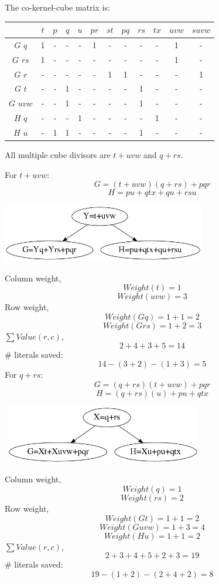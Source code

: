 \documentclass[12pt]{article}
\begin{document}
The co-kernel-cube matrix is:
\begin{center}
    \tabcolsep=8pt
    \begin{tabular}{|c|ccccccccccc|}
        \hline
                  & $t$ & $p$ & $q$ & $u$ & $pr$ & $st$ & $pq$ & $rs$ & $tx$ & $uvw$ & $suvw$ \\
        \hline
        $G$ $q$   & 1   & -  &  -   & -   & 1    & -    & -    & -    & -    & 1     & -      \\
        $G$ $rs$  & 1   & -  &  -   & -   & -    & -    & -    & -    & -    & 1     & -      \\
        $G$ $r$   & -   & -  &  -   & -   & -    & 1    & 1    & -    & -    & -     & 1      \\
        $G$ $t$   & -   & -  &  1   & -   & -    & -    & -    & 1    & -    & -     & -      \\
        $G$ $uvw$ & -   & -  &  1   & -   & -    & -    & -    & 1    & -    & -     & -      \\
        $H$ $q$   & -   & -  &  -   & 1   & -    & -    & -    & -    & 1    & -     & -      \\
        $H$ $u$   & -   & 1  &  1   & -   & -    & -    & -    & 1    & -    & -     & -      \\
        \hline
    \end{tabular}
\end{center}

All multiple cube divisors are $t+uvw$ and $q+rs$.

For $t+uvw$:
\[G=(t+uvw)(q+rs)+pqr\]
\[H=pu+qtx+qu+rsu\]
\begin{center}
    \includegraphics[width = 3.50in, height = 1.00in]{t_add_uvw.png}
\end{center}
Column weight,
\[Weight(t)=1\]
\[Weight(uvw)=3\]
Row weight,
\[Weight(G q)=1+1=2\]
\[Weight(G rs)=1+2=3\]
$\sum{Value(r,c)}$,
\[2+4+3+5=14\]
\# literals saved:
\[14-(3+2)-(1+3)=5\]
For $q+rs$:
\[G=(q+rs)(t+uvw)+pqr\]
\[H=(q+rs)(u)+pu+qtx\]
\begin{center}
    \includegraphics[width = 3.50in, height = 1.00in]{q_add_rs.png}
\end{center}
Column weight,
\[Weight(q)=1\]
\[Weight(rs)=2\]
Row weight,
\[Weight(G t)=1+1=2\]
\[Weight(G uvw)=1+3=4\]
\[Weight(H u)=1+1=2\]
$\sum{Value(r,c)}$,
\[2+3+4+5+2+3=19\]
\# literals saved:
\[19-(1+2)-(2+4+2)=8\]
\end{document}

